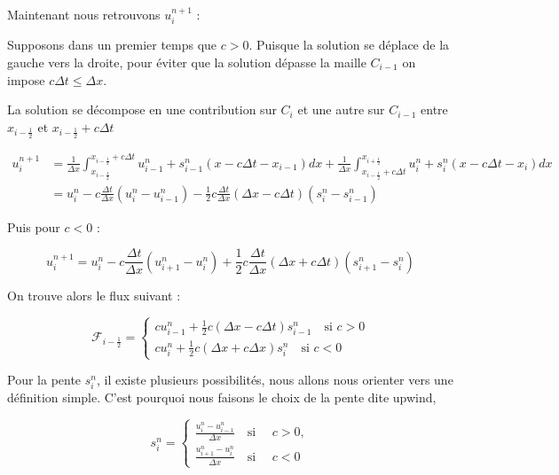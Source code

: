 \vspace{1em}
Maintenant nous retrouvons $u_i^{n+1}$ :

Supposons dans un premier temps que $c>0$. Puisque la solution se déplace de la gauche vers la droite, pour éviter que la solution dépasse la maille $C_{i-1}$ on impose $c\Delta t \leq \Delta x$.

La solution se décompose en une contribution sur $C_i$ et une autre sur $C_{i-1}$ entre $x_{i -\frac{1}{2}}$ et $x_{i -\frac{1}{2}} + c\Delta t$

\begin{equation*}
    \begin{split}
        u_i^{n+1} &= \frac{1}{\Delta x} \int_{x_{i - \frac{1}{2}}}^{x_{i - \frac{1}{2}} + c\Delta t} u_{i-1}^n + s_{i-1}^n (x - c\Delta t -x_{i-1})dx + \frac{1}{\Delta x} \int_{x_{i - \frac{1}{2}} + c\Delta t}^{x_{i + \frac{1}{2}}} u_i^n + s_{i}^n (x - c\Delta t -x_i)dx \\
        &= u_i^n - c\frac{\Delta t}{\Delta x} (u_i^n - u_{i-1}^n) - \frac{1}{2}c \frac{\Delta t}{\Delta x} (\Delta x - c \Delta t) (s_i^n - s_{i-1}^n)
    \end{split}
\end{equation*}

Puis pour $c < 0$ : 

$$u_i^{n+1} = u_i^n -c\frac{\Delta t}{\Delta x}(u_{i+1}^n - u_i^n) + \frac{1}{2}c\frac{\Delta t}{\Delta x}(\Delta x + c\Delta t)(s_{i+1}^n - s_i^n) $$

\vspace{1em}

On trouve alors le flux suivant :

$$\mathcal{F}_{i - \frac{1}{2}} = \begin{cases}
    cu_{i-1}^n + \frac{1}{2}c(\Delta x - c\Delta t)s_{i-1}^n \quad \text{si } c>0 \\
    cu_i^n + \frac{1}{2}c(\Delta x + c\Delta x)s_i^n \quad \text{si } c<0
\end{cases}$$

Pour la pente $s_i^n$, il existe plusieurs possibilités, nous allons nous orienter vers une définition simple. C'est pourquoi nous faisons le choix de la pente dite upwind, 

$$ s_i^n = \begin{cases}
    \frac{u_i^n - u_{i-1}^n}{\Delta x} \quad \text{si } \quad c>0, \\
    \frac{u_{i+1}^n - u_i^n}{\Delta x} \quad \text{si } \quad c<0
\end{cases}$$

